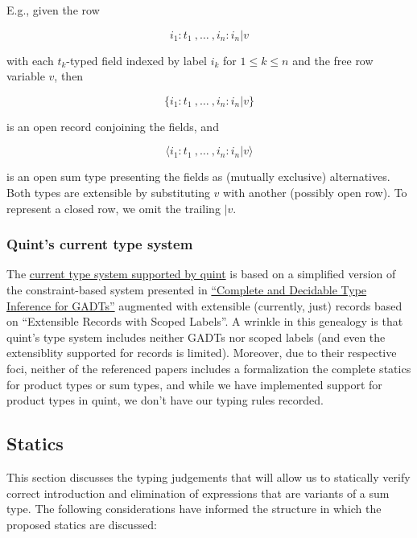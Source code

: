 \documentclass[11pt]{article}
\begin{document}
E.g., given the row

$$
i_1 : t_1 \ , \ldots \ , i_n : i_n | v
$$

with each \(t_k\)-typed field indexed by label \(i_k\) for
\(1 \le k \le n\) and the free row variable \(v\), then

$$
\{i_1 : t_1 \ , \ldots \ , i_n : i_n | v\}
$$

is an open record conjoining the fields, and

$$
\langle i_1 : t_1 \ , \ldots \ , i_n : i_n | v \rangle
$$

is an open sum type presenting the fields as (mutually exclusive)
alternatives. Both types are extensible by substituting \(v\) with
another (possibly open row). To represent a closed row, we omit the
trailing \(| v\).

\subsubsection{Quint's current type system}
\label{sec:org12dc16c}

The \href{https://github.com/informalsystems/quint/tree/main/doc/adr005-type-system.md}{current type system supported by quint} is based on a simplified version of
the constraint-based system presented in \href{https://www.microsoft.com/en-us/research/publication/complete-and-decidable-type-inference-for-gadts/}{``Complete and Decidable Type Inference
for GADTs''} augmented with extensible (currently, just) records based on
``Extensible Records with Scoped Labels''. A wrinkle in this genealogy is that
quint's type system includes neither GADTs nor scoped labels (and even the
extensiblity supported for records is limited). Moreover, due to their
respective foci, neither of the referenced papers includes a formalization the
complete statics for product types or sum types, and while we have implemented
support for product types in quint, we don't have our typing rules recorded.

\subsection{Statics}
\label{sec:org6da5dcb}
This section discusses the typing judgements that will allow us to
statically verify correct introduction and elimination of expressions
that are variants of a sum type. The following considerations have
informed the structure in which the proposed statics are discussed:
\end{document}

